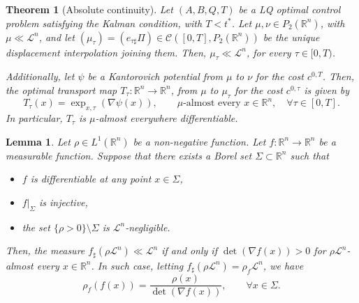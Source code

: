 \documentclass[10pt,a4paper]{amsart}
\newtheorem{thm}{Theorem}
\newtheorem{lem}{Lemma}
\begin{document}
	\begin{thm}[Absolute continuity]\label{absolute_continuity-dyn_opt_coupl}
      Let $(A,B,Q,T)$ be a LQ optimal control problem satisfying the Kalman condition, with $T<t^*$. Let $\mu, \nu\in P_2(\mathbb{R}^n)$, with $\mu\ll\mathscr{L}^n$, and let $(\mu_\tau)=(e_{\tau\sharp}\Pi)\in\mathcal{C}([0,T],P_2(\mathbb{R}^n))$ be the unique displacement interpolation joining them. Then, $\mu_\tau\ll\mathscr{L}^n$, for every $\tau\in[0,T)$. 

        Additionally, let $\psi$ be a Kantorovich potential from $\mu$ to $\nu$ for the cost $c^{0,T}$. Then, the optimal transport map $T_\tau:\mathbb{R}^n\to\mathbb{R}^n$, from $\mu$ to $\mu_\tau$ for the cost $c^{0,\tau}$ is given by
        \begin{equation}
			T_\tau(x)=\exp_{x,\tau}(\nabla\psi(x)),\qquad\mu\text{-almost every }x\in\mathbb{R}^n, \quad\forall \tau\in[0,T].
		\end{equation}
        In particular, $T_\tau$ is $\mu$-almost everywhere differentiable.
	\end{thm}

		\begin{lem}\label{Jacobian_and_densities}
			Let $\rho\in L^1(\mathbb{R}^n)$ be a non-negative function. Let $f:\mathbb{R}^n\to\mathbb{R}^n$ be a measurable function. Suppose that there exists a Borel set $\Sigma\subset\mathbb{R}^n$ such that
			\begin{itemize}
				\item $f$ is differentiable at any point $x\in\Sigma$,
				\item $f|_{\Sigma}$ is injective,
				\item the set $\{\rho>0\}\setminus\Sigma$ is $\mathscr{L}^n$-negligible.
			\end{itemize}
			Then, the measure $f_{\sharp}(\rho\mathscr{L}^n) \ll \mathscr{L}^n$ if and only if $\det(\nabla f(x))>0$ for $\rho\mathscr{L}^n$-almost every $x\in\mathbb{R}^n$. In such case, letting $f_{\sharp}(\rho\mathscr{L}^n)=\rho_f\mathscr{L}^n$, we have
			\begin{equation}
				\rho_f(f(x))=\frac{\rho(x)}{\det(\nabla f(x))},\qquad\forall x\in\Sigma.
			\end{equation}
		\end{lem}
\end{document}
